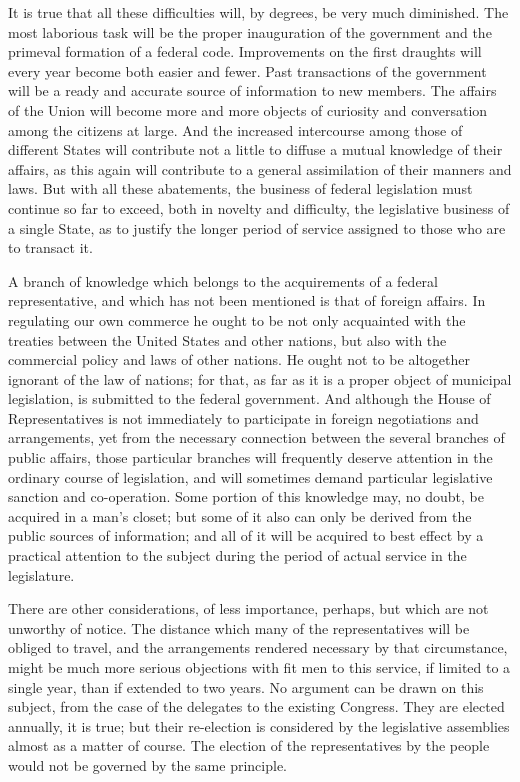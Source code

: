 It is true that all these difficulties will, by degrees, be very much diminished. The most laborious task will be the proper inauguration of the government and the primeval formation of a federal code. Improvements on the first draughts will every year become both easier and fewer. Past transactions of the government will be a ready and accurate source of information to new members. The affairs of the Union will become more and more objects of curiosity and conversation among the citizens at large. And the increased intercourse among those of different States will contribute not a little to diffuse a mutual knowledge of their affairs, as this again will contribute to a general assimilation of their manners and laws. But with all these abatements, the business of federal legislation must continue so far to exceed, both in novelty and difficulty, the legislative business of a single State, as to justify the longer period of service assigned to those who are to transact it.

A branch of knowledge which belongs to the acquirements of a federal representative, and which has not been mentioned is that of foreign affairs. In regulating our own commerce he ought to be not only acquainted with the treaties between the United States and other nations, but also with the commercial policy and laws of other nations. He ought not to be altogether ignorant of the law of nations; for that, as far as it is a proper object of municipal legislation, is submitted to the federal government. And although the House of Representatives is not immediately to participate in foreign negotiations and arrangements, yet from the necessary connection between the several branches of public affairs, those particular branches will frequently deserve attention in the ordinary course of legislation, and will sometimes demand particular legislative sanction and co-operation. Some portion of this knowledge may, no doubt, be acquired in a man's closet; but some of it also can only be derived from the public sources of information; and all of it will be acquired to best effect by a practical attention to the subject during the period of actual service in the legislature.

There are other considerations, of less importance, perhaps, but which are not unworthy of notice. The distance which many of the representatives will be obliged to travel, and the arrangements rendered necessary by that circumstance, might be much more serious objections with fit men to this service, if limited to a single year, than if extended to two years. No argument can be drawn on this subject, from the case of the delegates to the existing Congress. They are elected annually, it is true; but their re-election is considered by the legislative assemblies almost as a matter of course. The election of the representatives by the people would not be governed by the same principle.

